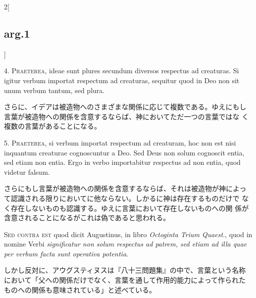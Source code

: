 \documentclass[paper=a4paper,fontsize=10pt,jafontsize=9pt,titlepage]{jlreq}
\begin{document}
\begin{paracol}{2}[\subsection{arg.1}]

4. {\scshape Praeterea}, ideae sunt plures secundum diversos respectus ad
creaturas. Si igitur verbum importat respectum ad creaturas, sequitur
quod in Deo non sit unum verbum tantum, sed plura.

\switchcolumn

さらに、イデアは被造物へのさまざまな関係に応じて複数である。ゆえにもし
 言葉が被造物への関係を含意するならば、神においてただ一つの言葉ではな
 く複数の言葉があることになる。


5. {\scshape Praeterea}, si verbum importat respectum ad creaturam, hoc non est nisi
inquantum creaturae cognoscuntur a Deo. Sed Deus non solum cognoscit
entia, sed etiam non entia. Ergo in verbo importabitur respectus ad
non entia, quod videtur falsum.

\switchcolumn

さらにもし言葉が被造物への関係を含意するならば、それは被造物が神によっ
 て認識される限りにおいてに他ならない。しかるに神は存在するものだけで
 なく存在しないものも認識する。ゆえに言葉において存在しないものへの関
 係が含意されることになるがこれは偽であると思われる。

\switchcolumn*[\subsection{s.c.}]

{\scshape Sed contra est} quod dicit Augustinus, in libro {\itshape Octoginta Trium
Quaest}., quod in nomine Verbi {\itshape significatur non solum respectus ad
patrem, sed etiam ad illa quae per verbum facta sunt operativa
potentia}.

\switchcolumn

しかし反対に、アウグスティヌスは『八十三問題集』の中で、言葉という名称
 において「父への関係だけでなく、言葉を通して作用的能力によって作られた
 ものへの関係も意味されている」と述べている。



\end{paracol}
\end{document}
